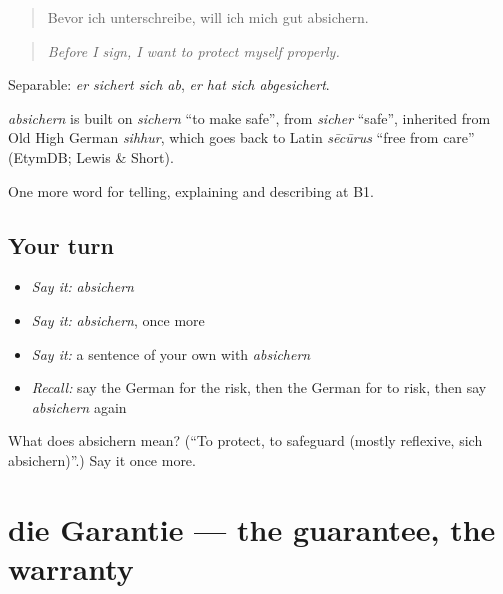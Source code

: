 \begin{quote}
Bevor ich unterschreibe, will ich mich gut absichern.
\end{quote}

\begin{quote}
\emph{Before I sign, I want to protect myself properly.}
\end{quote}

Separable: \emph{er sichert sich ab}, \emph{er hat sich abgesichert}.

\begin{cousinweb}
\emph{absichern} is built on \emph{sichern} \textquotedblleft{}to make safe\textquotedblright{}, from \emph{sicher} \textquotedblleft{}safe\textquotedblright{}, inherited from Old High German \emph{sihhur}, which goes back to Latin \emph{sēcūrus} \textquotedblleft{}free from care\textquotedblright{} (EtymDB; Lewis \& Short).
\end{cousinweb}

\begin{grammarlens}[title={What you've built}]
One more word for telling, explaining and describing at B1.
\end{grammarlens}

\subsection*{Your turn}
\begin{itemize}
\raggedright
  \item \emph{Say it:} \emph{absichern}
  \item \emph{Say it:} \emph{absichern}, once more
  \item \emph{Say it:} a sentence of your own with \emph{absichern}
  \item \emph{Recall:} say the German for the risk, then the German for to risk, then say \emph{absichern} again
\end{itemize}

\begin{tcolorbox}[breakable,colback=teal!4,colframe=teal!35!black,title={Before you move on}]
What does absichern mean? (\textquotedblleft{}To protect, to safeguard (mostly reflexive, sich absichern)\textquotedblright{}.) Say it once more.
\end{tcolorbox}
\section[die Garantie]{die Garantie — the guarantee, the warranty}

